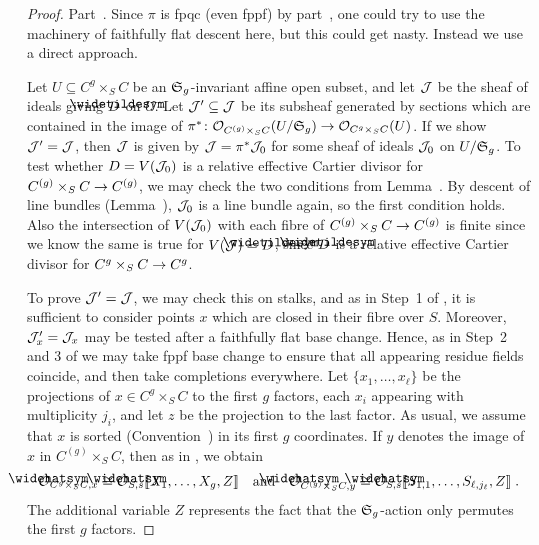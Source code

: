 \documentclass[a4paper,parskip=half,numbers=enddot, DIV=12]{scrreprt}
\begin{document}
\begin{proof}
	Part~. Since $\pi$ is fpqc (even fppf) by part~, one could try to use the machinery of faithfully flat descent here, but this could get nasty. Instead we use a direct approach.
	
	 Let $U\subseteq C^g\times_SC$ be an $\mathfrak{S}_g$-invariant affine open subset, and let $\mathcal{J}$ be the sheaf of ideals giving $\snake{D}$ on  $U$. Let $\mathcal{J}'\subseteq \mathcal{J}$ be its subsheaf generated by sections which are contained in the image of $\pi^*\colon \Oo_{C^{(g)}\times_SC}(U/\SS_g)\morphism\Oo_{C^g\times_SC}(U)$. If we show $\mathcal{J}'=\mathcal{J}$, then $\mathcal{J}$ is given by $\mathcal{J}=\pi^*\mathcal{J}_0$ for some sheaf of ideals $\mathcal{J}_0$ on $U/\mathfrak{S}_g$. To test whether $D=V(\mathcal{J}_0)$ is a relative effective Cartier divisor for $C^{(g)}\times_SC\morphism C^{(g)}$, we may check the two conditions from Lemma~. By descent of line bundles (Lemma~), $\mathcal{J}_0$ is a line bundle again, so the first condition holds. Also the intersection of $V(\mathcal{J}_0)$ with each fibre of $C^{(g)}\times_SC\morphism C^{(g)}$ is finite since we know the same is true for $V(\Jj)=\snake{D}$, since $\snake{D}$ is a relative effective Cartier divisor for $C^g\times_SC\morphism C^g$.
	 
	 To prove $\mathcal{J}'=\mathcal{J}$, we may check this on stalks, and as in Step~1 of , it is sufficient to consider points $x$ which are closed in their fibre over $S$. Moreover, $\mathcal{J}'_x=\mathcal{J}_x$ may be tested after a faithfully flat base change. Hence, as in Step~2 and 3 of  we may take fppf base change to ensure that all appearing residue fields coincide, and then take completions everywhere. Let $\{x_1,\ldots,x_\ell\}$ be the projections of $x\in C^g\times_S C$ to the first $g$ factors, each $x_i$ appearing with multiplicity $j_i$, and let $z$ be the projection to the last factor. As usual, we assume that $x$ is sorted (Convention~) in its first $g$ coordinates. If $y$ denotes the image of $x$ in $C^{(g)}\times_SC$, then as in , we obtain
	 \begin{align}\lbl{eq:OCgx4}
	 	\roof{\Oo}_{C^g\times_SC,x}\cong \roof{\Oo}_{S,s}\llbracket X_1,\ldots,X_g,Z\rrbracket\quad\text{and}\quad\roof{\Oo}_{C^{(g)}\times_SC,y}\cong \roof{\Oo}_{S,s}\llbracket S_{1,1},\ldots,S_{\ell,j_\ell},Z\rrbracket\;.
	 \end{align}
	 The additional variable $Z$ represents the fact that the $\mathfrak{S}_g$-action only permutes the first $g$ factors.
	 

\end{proof}
\end{document}

